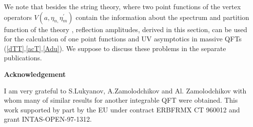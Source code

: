 \documentclass[a4paper,12pt]{article}
\begin{document}
We note that besides the string theory, where two point functions of the
vertex operators $V(a,\eta _{n,}\eta _m^{\prime })$ contain the information
about the spectrum \cite{DVV} and partition function of the theory \cite{MOG}, 
reflection amplitudes,
derived in this section, can be used for the calculation of one point
functions and UV asymptotics in massive QFTs (\ref{dTT},\ref{acT},\ref{Adu}).
We suppose to discuss these problems in the separate publications.

\begin{center}
{\bf Acknowledgement}
\end{center}
I am very grateful to S.Lukyanov, A.Zamolodchikov and Al.
Zamolodchikov with whom many of similar results for another integrable QFT
were obtained. This work supported by part by the EU under contract ERBFRMX
CT 960012 and grant INTAS-OPEN-97-1312.
\end{document}

